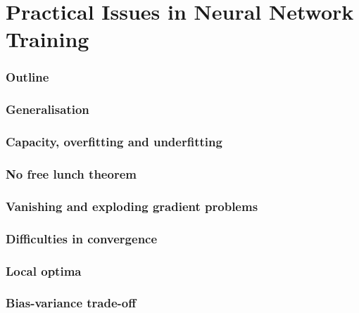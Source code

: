 \renewcommand{\thispart}{5 }
\renewcommand{\thispartname}{Practical Issues in Neural Network Training}

\part{\thispartname}

\section{Outline}




\section{Generalisation}


\section{Capacity, overfitting and underfitting}



\section{No free lunch theorem}


\section{Vanishing and exploding gradient problems}

\section{Difficulties in convergence}
\section{Local optima}

\section{Bias-variance trade-off}








